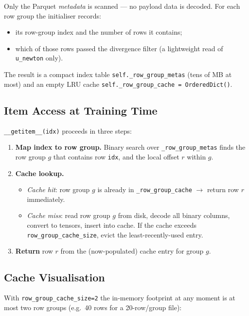\documentclass{article}
\begin{document}
Only the Parquet \emph{metadata} is scanned --- no payload data is decoded.
For each row group the initialiser records:
\begin{itemize}[noitemsep]
  \item its row-group index and the number of rows it contains;
  \item which of those rows passed the divergence filter (a lightweight
    read of \texttt{u\_newton} only).
\end{itemize}

The result is a compact index table \texttt{self.\_row\_group\_metas}
(tens of MB at most) and an empty LRU cache
\texttt{self.\_row\_group\_cache = OrderedDict()}.

\subsection{Item Access at Training Time}

\texttt{\_\_getitem\_\_(idx)} proceeds in three steps:

\begin{enumerate}[noitemsep]
  \item \textbf{Map index to row group.}
    Binary search over \texttt{\_row\_group\_metas} finds the row group $g$
    that contains row \texttt{idx}, and the local offset $r$ within $g$.
  \item \textbf{Cache lookup.}
    \begin{itemize}[noitemsep]
      \item \textit{Cache hit}: row group $g$ is already in
        \texttt{\_row\_group\_cache} $\to$ return row $r$ immediately.
      \item \textit{Cache miss}: read row group $g$ from disk, decode all
        binary columns, convert to tensors, insert into cache.
        If the cache exceeds \texttt{row\_group\_cache\_size}, evict the
        least-recently-used entry.
    \end{itemize}
  \item \textbf{Return} row $r$ from the (now-populated) cache entry for
    group $g$.
\end{enumerate}

\subsection{Cache Visualisation}

With \texttt{row\_group\_cache\_size=2} the in-memory footprint at any
moment is at most two row groups (e.g.\ 40 rows for a 20-row/group file):
\end{document}
